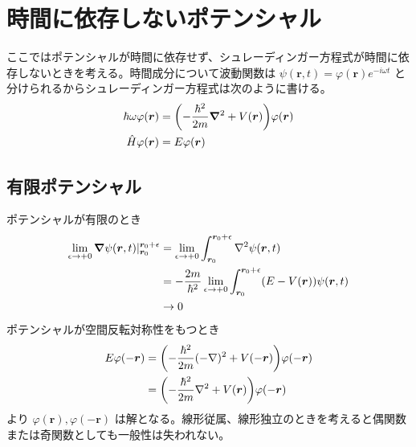 \documentclass[uplatex,dvipdfmx,a4paper,11pt]{jlreq}
\newcommand{\rr}{\bm{r}}
\theoremstyle{definition}
\begin{document}
\section{時間に依存しないポテンシャル}
ここではポテンシャルが時間に依存せず、シュレーディンガー方程式が時間に依存しないときを考える。時間成分について波動関数は $\psi(\rr, t) = \varphi(\rr)e^{-i\omega t}$ と分けられるからシュレーディンガー方程式は次のように書ける。
\begin{align}
  \hbar\omega\varphi(\rr) & = \qty(-\frac{\hbar^2}{2m}\vnabla^2 + V(\rr))\varphi(\rr) \\
  \hat{H}\varphi(\rr)     & = E\varphi(\rr)
\end{align}

\subsection{有限ポテンシャル}
ポテンシャルが有限のとき
\begin{align}
  \lim_{\epsilon\to +0}\vnabla\psi(\rr, t)|_{\rr_0}^{\rr_0 + \epsilon} & = \lim_{\epsilon\to +0}\int_{\rr_0}^{\rr_0 + \epsilon}\nabla^2\psi(\rr, t)                        \\
                                                                       & = -\frac{2m}{\hbar^2}\lim_{\epsilon\to +0}\int_{\rr_0}^{\rr_0 + \epsilon}(E - V(\rr))\psi(\rr, t) \\
                                                                       & \to 0
\end{align}
ポテンシャルが空間反転対称性をもつとき
\begin{align}
  E\varphi(-\rr) & = \qty(-\frac{\hbar^2}{2m}(-\nabla)^2 + V(-\rr))\varphi(-\rr) \\
                 & = \qty(-\frac{\hbar^2}{2m}\nabla^2 + V(\rr))\varphi(-\rr)
\end{align}
より $\varphi(\rr), \varphi(-\rr)$ は解となる。線形従属、線形独立のときを考えると偶関数または奇関数としても一般性は失われない。
\end{document}
